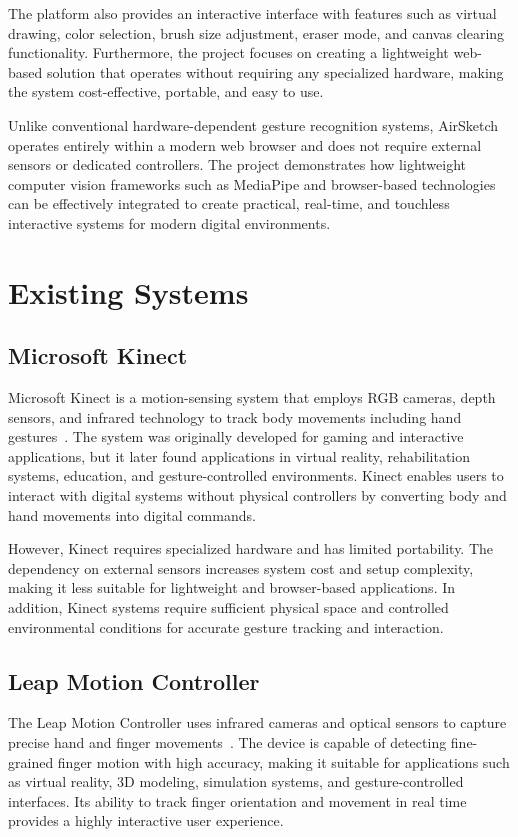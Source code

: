 \documentclass[conference]{IEEEtran}
\begin{document}
The platform also provides an interactive interface with features such as virtual drawing, color selection, brush size adjustment, eraser mode, and canvas clearing functionality. Furthermore, the project focuses on creating a lightweight web-based solution that operates without requiring any specialized hardware, making the system cost-effective, portable, and easy to use.

Unlike conventional hardware-dependent gesture recognition systems, AirSketch operates entirely within a modern web browser and does not require external sensors or dedicated controllers. The project demonstrates how lightweight computer vision frameworks such as MediaPipe and browser-based technologies can be effectively integrated to create practical, real-time, and touchless interactive systems for modern digital environments.

\section{Existing Systems}

\subsection{Microsoft Kinect}

Microsoft Kinect is a motion-sensing system that employs RGB cameras, depth sensors, and infrared technology to track body movements including hand gestures~\cite{ref7}. The system was originally developed for gaming and interactive applications, but it later found applications in virtual reality, rehabilitation systems, education, and gesture-controlled environments. Kinect enables users to interact with digital systems without physical controllers by converting body and hand movements into digital commands.

However, Kinect requires specialized hardware and has limited portability. The dependency on external sensors increases system cost and setup complexity, making it less suitable for lightweight and browser-based applications. In addition, Kinect systems require sufficient physical space and controlled environmental conditions for accurate gesture tracking and interaction.

\subsection{Leap Motion Controller}

The Leap Motion Controller uses infrared cameras and optical sensors to capture precise hand and finger movements~\cite{ref5}. The device is capable of detecting fine-grained finger motion with high accuracy, making it suitable for applications such as virtual reality, 3D modeling, simulation systems, and gesture-controlled interfaces. Its ability to track finger orientation and movement in real time provides a highly interactive user experience.
\end{document}
